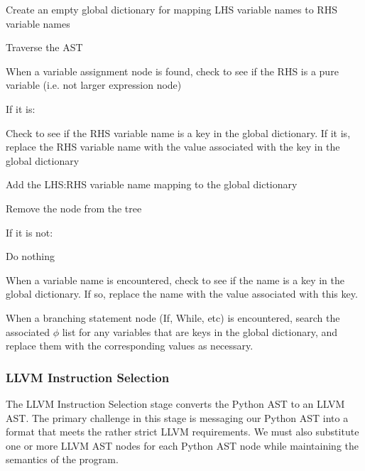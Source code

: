 \documentclass[11pt,twocolumn]{article}
\newenvironment{packed_enum}{
\begin{enumerate}
  \setlength{\itemsep}{1pt}
  \setlength{\parskip}{0pt}
  \setlength{\parsep}{0pt}
}{\end{enumerate}}
\begin{document}
\begin{packed_enum}
\item Create an empty global dictionary for mapping LHS variable names
  to RHS variable names
\item Traverse the AST
\item When a variable assignment node is found, check to see if the
  RHS is a pure variable (i.e. not larger expression node)
  \begin{packed_enum}
  \item If it is:
    \begin{packed_enum}
    \item Check to see if the RHS variable name is a key in the
      global dictionary. If it is, replace the RHS variable name with the
      value associated with the key in the global dictionary
    \item Add the LHS:RHS variable name mapping to the global dictionary
    \item Remove the node from the tree
    \end{packed_enum}
  \item If it is not:
    \begin{packed_enum}
      \item Do nothing
    \end{packed_enum}
  \end{packed_enum}
\item When a variable name is encountered, check to see if the name is
  a key in the global dictionary. If so, replace the name with the
  value associated with this key.
\item When a branching statement node (If, While, etc) is encountered,
  search the associated $\phi$ list for any variables that are keys in
  the global dictionary, and replace them with the corresponding
  values as necessary.
\end{packed_enum}

\subsubsection{LLVM Instruction Selection}
\label{sec:stage-LLVMInstructionSelection}

The LLVM Instruction Selection stage converts the Python AST to an LLVM
AST. The primary challenge in this stage is messaging our Python AST
into a format that meets the rather strict LLVM requirements. We must
also substitute one or more LLVM AST nodes for each Python AST node
while maintaining the semantics of the program.
\end{document}
